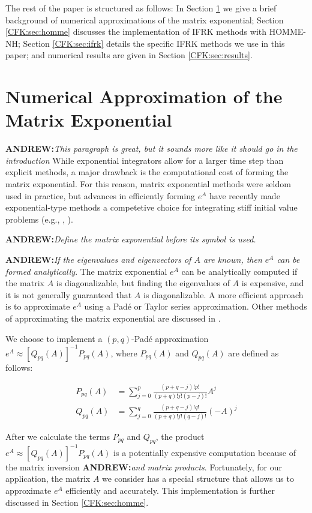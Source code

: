 \documentclass{csri19}
\newcommand{\A}[1]{\textbf{ANDREW:}\textit{#1}}
\begin{document}
The rest of the paper is structured as follows: In Section 
\ref{CFK:sec:matexp} we give a brief background of numerical approximations 
of the matrix exponential; Section \ref{CFK:sec:homme} discusses the 
implementation of IFRK methods with HOMME-NH; Section \ref{CFK:sec:ifrk} 
details the specific IFRK methods we use in this paper; and numerical 
results are given in Section \ref{CFK:sec:results}.

\section{Numerical Approximation of the Matrix Exponential}
\label{CFK:sec:matexp} 
\A{This paragraph is great, but it sounds more like it should go in the introduction} While exponential integrators allow for a larger time step than explicit 
methods, a major drawback is the computational cost of forming the matrix 
exponential. For this reason, matrix exponential methods were seldom used 
in practice, but advances in efficiently forming $e^A$ have recently made 
exponential-type methods a competetive choice for integrating stiff initial 
value problems (e.g., \cite{CFK:Clancy2013}, \cite{CFK:Garcia2014}).

\A{Define the matrix exponential before its symbol is used.}

\A{If the eigenvalues and eigenvectors of $A$ are known, then $e^A$ can be formed analytically}.
The matrix exponential $e^A$ can be analytically computed if the matrix $A$ 
is diagonalizable, but finding the eigenvalues of $A$ is expensive, and it 
is not generally guaranteed that $A$ is diagonalizable. A more efficient 
approach is to approximate $e^{A}$ using a Pad\'e or Taylor series 
approximation. Other methods of approximating the matrix exponential are 
discussed in \cite{CFK:Moler2003}.

We choose to implement a $(p,q)$-Pad\'e approximation 
$e^{A}\approx \left[Q_{pq}(A)\right]^{-1}P_{pq}(A)$, where $P_{pq}(A)$ and 
$Q_{pq}(A)$ are defined as follows:

\begin{align}
\label{CFK:eqn:PadeP}
P_{pq}(A) &= \sum_{j=0}^p\frac{(p+q-j)!p!}{(p+q)!j!(p-j)!}A^j\\
\label{CFK:eqn:PadeQ}
Q_{pq}(A) &= \sum_{j=0}^q\frac{(p+q-j)!q!}{(p+q)!j!(q-j)!}(-A)^j
\end{align}

After we calculate the terms $P_{pq}$ and $Q_{pq}$, the product 
$e^A\approx\left[Q_{pq}(A)\right]^{-1}P_{pq}(A)$ is a potentially expensive 
computation because of the matrix inversion \A{and matrix products}. Fortunately, for our 
application, the matrix $A$ we consider has a special structure that allows 
us to approximate $e^A$ efficiently and accurately. This implementation is 
further discussed in Section \ref{CFK:sec:homme}.
\end{document}
